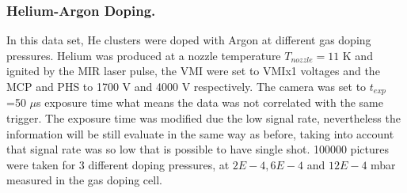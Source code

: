 \subsubsection{Helium-Argon Doping.}

In this data set, He clusters were doped with Argon at different gas doping pressures. Helium was produced at a nozzle temperature $T_{nozzle}= 11$ K and ignited by the MIR laser pulse, the VMI were set to VMIx1 voltages and the MCP and PHS to 1700 V and 4000 V respectively. The camera was set to $t_{exp}$=50 $\mu$s exposure time what means the data was not correlated with the same trigger. The exposure time was modified due the low signal rate, nevertheless the information will be still evaluate in the same way  as before, taking into account that signal rate was so low that is possible to have single shot.  100000 pictures were taken for 3 different doping pressures, at $2E-4, 6E-4$ and $12E-4$ mbar measured in the gas doping cell. 

